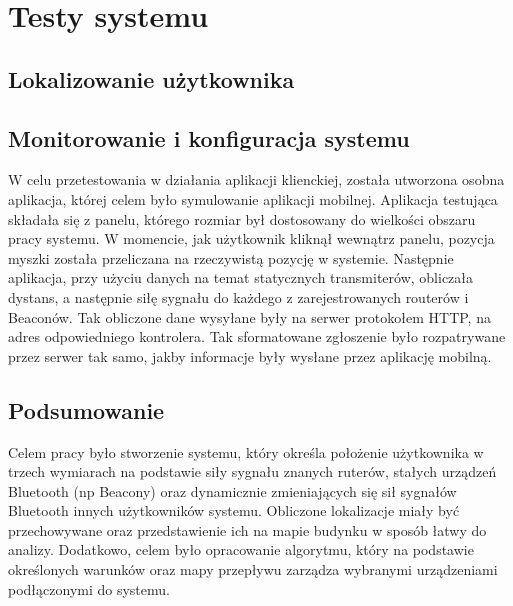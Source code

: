 \chapter{Testy systemu}
\section{Lokalizowanie użytkownika}
\section{Monitorowanie i konfiguracja systemu}
W celu przetestowania w działania aplikacji klienckiej, została utworzona osobna aplikacja, której celem było symulowanie aplikacji mobilnej. Aplikacja testująca składała się z panelu, którego rozmiar był dostosowany do wielkości obszaru pracy systemu. W momencie, jak użytkownik kliknął wewnątrz panelu, pozycja myszki została przeliczana na rzeczywistą pozycję w systemie. Następnie aplikacja, przy użyciu danych na temat statycznych transmiterów, obliczała dystans, a następnie siłę sygnału do każdego z zarejestrowanych routerów i Beaconów. Tak obliczone dane wysyłane były na serwer protokołem HTTP, na adres odpowiedniego kontrolera. Tak sformatowane zgłoszenie było rozpatrywane przez serwer tak samo, jakby informacje były wysłane przez aplikację mobilną.\\
\section{Podsumowanie}
Celem pracy było stworzenie systemu, który określa położenie użytkownika w trzech wymiarach na podstawie siły sygnału znanych ruterów, stałych urządzeń Bluetooth (np Beacony) oraz dynamicznie zmieniających się sił sygnałów Bluetooth innych użytkowników systemu. Obliczone lokalizacje miały być przechowywane oraz przedstawienie ich na mapie budynku w sposób łatwy do analizy. Dodatkowo, celem było opracowanie algorytmu, który na podstawie określonych warunków oraz mapy przepływu zarządza wybranymi urządzeniami podłączonymi do systemu.